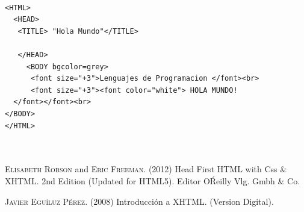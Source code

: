 \documentclass[11pt]{article} %
\begin{document}
\begin{center}

\end{center}

\begin{lstlisting}[frame=single]  % Start your code-block

<HTML>
  <HEAD>
   <TITLE> "Hola Mundo"</TITLE>

   </HEAD>
     <BODY bgcolor=grey>
      <font size="+3">Lenguajes de Programacion </font><br>
      <font size="+3"><font color="white"> HOLA MUNDO!
  </font></font><br>
</BODY>
</HTML>



\end{lstlisting}

\begin{thebibliography}{X}
 \textsc{Elisabeth Robson} and \textsc{Eric Freeman}. (2012) Head First HTML with Css \& XHTML.
2nd Edition (Updated for HTML5). Editor O\'Reilly Vlg. Gmbh \& Co.

 \textsc{Javier Eguíluz Pérez}. (2008) Introducción a XHTML. (Version Digital).
\end{thebibliography}
\end{document}
